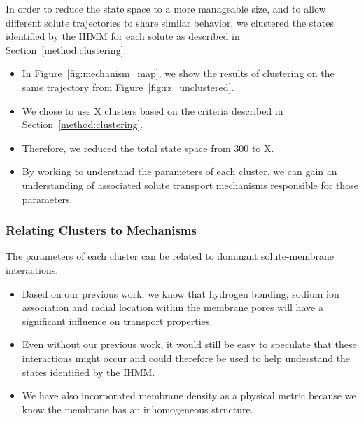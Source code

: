 \documentclass[journal=jpcbfk,manuscript=article]{achemso}
\begin{document}
  In order to reduce the state space to a more manageable size, and to allow
  different solute trajectories to share similar behavior, we clustered the
  states identified by the IHMM for each solute as described in 
  Section~\ref{method:clustering}.
  \begin{itemize}
    \item In Figure~\ref{fig:mechanism_map}, we show the results of clustering on the same trajectory
    from Figure~\ref{fig:rz_unclustered}.
    \item We chose to use X clusters based on the criteria described in 
    Section~\ref{method:clustering}.  %
    \item Therefore, we reduced the total state space from 300 to X.  %
    \item By working to understand the parameters of each cluster, we can 
    gain an understanding of associated solute transport mechanisms responsible for 
    those parameters.
  \end{itemize}
  

  \subsubsection*{Relating Clusters to Mechanisms}
  
  The parameters of each cluster can be related to dominant solute-membrane interactions.
  \begin{itemize}
    \item Based on our previous work, we know that hydrogen bonding, sodium ion 
    association and radial location within the membrane pores will have a significant
    influence on transport properties. 
    \item Even without our previous work, it would still be easy to speculate that these 
    interactions might occur and could therefore be used to help understand the 
    states identified by the IHMM.
    \item We have also incorporated membrane density as a physical metric because we 
    know the membrane has an inhomogeneous structure.
  \end{itemize}
  
\end{document}
